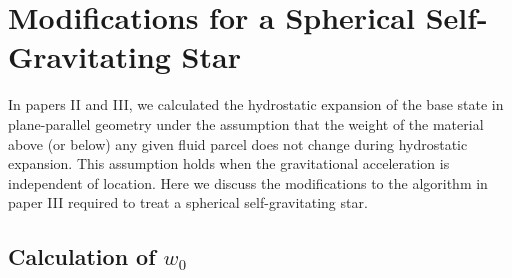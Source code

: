 
\section{\label{app:gravity} Modifications for a Spherical Self-Gravitating Star}

In papers II and III, we calculated the hydrostatic expansion of the base state
in plane-parallel geometry under the assumption that the weight of the
material above (or below) any given fluid parcel does not change
during hydrostatic expansion.  This assumption holds when the
gravitational acceleration is independent of location.  Here we discuss the
modifications to the algorithm in paper III required to treat a spherical 
self-gravitating star.

\subsection{Calculation of $w_0$}\label{Sec:Spherical w0 Calculation}



